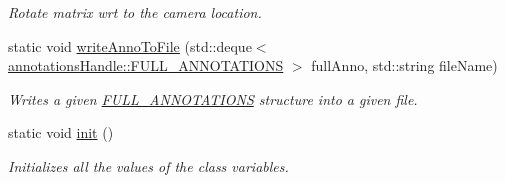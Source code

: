\begin{DoxyCompactItemize}
\begin{DoxyCompactList}\small\item\em Rotate matrix wrt to the camera location. \item\end{DoxyCompactList}\item 
\hypertarget{classannotationsHandle_a4850f73ad0bd03d054634bd64bf28add}{
static void \hyperlink{classannotationsHandle_a4850f73ad0bd03d054634bd64bf28add}{writeAnnoToFile} (std::deque$<$ \hyperlink{structannotationsHandle_1_1FULL__ANNOTATIONS}{annotationsHandle::FULL\_\-ANNOTATIONS} $>$ fullAnno, std::string fileName)}
\label{classannotationsHandle_a4850f73ad0bd03d054634bd64bf28add}

\begin{DoxyCompactList}\small\item\em Writes a given \hyperlink{structannotationsHandle_1_1FULL__ANNOTATIONS}{FULL\_\-ANNOTATIONS} structure into a given file. \item\end{DoxyCompactList}\item 
\hypertarget{classannotationsHandle_a02fd73d861ef2e4aabb38c0c9ff82947}{
static void \hyperlink{classannotationsHandle_a02fd73d861ef2e4aabb38c0c9ff82947}{init} ()}
\label{classannotationsHandle_a02fd73d861ef2e4aabb38c0c9ff82947}

\begin{DoxyCompactList}\small\item\em Initializes all the values of the class variables. \item\end{DoxyCompactList}\end{DoxyCompactItemize}

